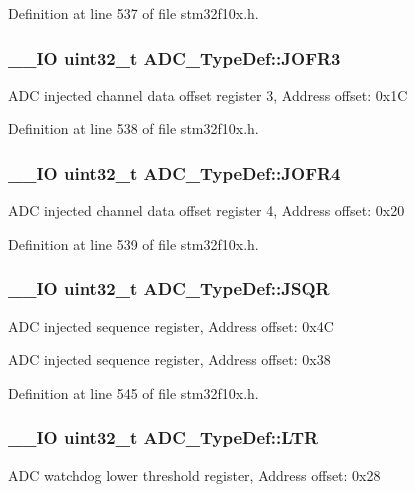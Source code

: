 Definition at line 537 of file stm32f10x.\-h.

\hypertarget{struct_a_d_c___type_def_ae9c78142f6edf8122384263878d09015}{
\subsubsection[{J\-O\-F\-R3}]{\setlength{\rightskip}{0pt plus 5cm}\-\_\-\-\_\-\-I\-O {\bf uint32\-\_\-t} A\-D\-C\-\_\-\-Type\-Def\-::\-J\-O\-F\-R3}}\label{struct_a_d_c___type_def_ae9c78142f6edf8122384263878d09015}
A\-D\-C injected channel data offset register 3, Address offset\-: 0x1\-C 

Definition at line 538 of file stm32f10x.\-h.

\hypertarget{struct_a_d_c___type_def_a92f5c1a5aaa8b286317f923482e09d35}{
\subsubsection[{J\-O\-F\-R4}]{\setlength{\rightskip}{0pt plus 5cm}\-\_\-\-\_\-\-I\-O {\bf uint32\-\_\-t} A\-D\-C\-\_\-\-Type\-Def\-::\-J\-O\-F\-R4}}\label{struct_a_d_c___type_def_a92f5c1a5aaa8b286317f923482e09d35}
A\-D\-C injected channel data offset register 4, Address offset\-: 0x20 

Definition at line 539 of file stm32f10x.\-h.

\hypertarget{struct_a_d_c___type_def_a5438a76a93ac1bd2526e92ef298dc193}{
\subsubsection[{J\-S\-Q\-R}]{\setlength{\rightskip}{0pt plus 5cm}\-\_\-\-\_\-\-I\-O {\bf uint32\-\_\-t} A\-D\-C\-\_\-\-Type\-Def\-::\-J\-S\-Q\-R}}\label{struct_a_d_c___type_def_a5438a76a93ac1bd2526e92ef298dc193}
A\-D\-C injected sequence register, Address offset\-: 0x4\-C

A\-D\-C injected sequence register, Address offset\-: 0x38 

Definition at line 545 of file stm32f10x.\-h.

\hypertarget{struct_a_d_c___type_def_afdaf8050fb01739206a92c9ad610f396}{
\subsubsection[{L\-T\-R}]{\setlength{\rightskip}{0pt plus 5cm}\-\_\-\-\_\-\-I\-O {\bf uint32\-\_\-t} A\-D\-C\-\_\-\-Type\-Def\-::\-L\-T\-R}}\label{struct_a_d_c___type_def_afdaf8050fb01739206a92c9ad610f396}
A\-D\-C watchdog lower threshold register, Address offset\-: 0x28 

